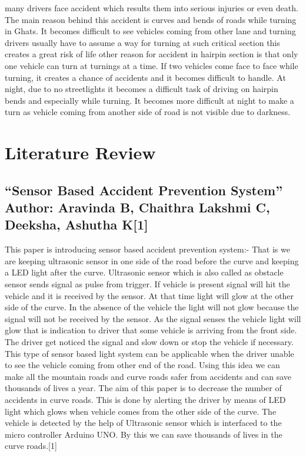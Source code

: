 \documentclass[conference]{IEEEtran}
\begin{document}
    many drivers face accident which results them into serious injuries or even death. The main reason behind
    this accident is curves and bends of roads while turning in Ghats. It becomes difficult to see vehicles coming
    from other lane and turning drivers usually have to assume a way for turning at such critical section this
    creates a great risk of life other reason for accident in hairpin section is that only one vehicle can turn at
    turnings at a time. If two vehicles come face to face while turning, it creates a chance of accidents and it
    becomes difficult to handle. At night, due to no streetlights it becomes a difficult task of driving on hairpin
    bends and especially while turning. It becomes more difficult at night to make a turn as vehicle coming from
    another side of road is not visible due to darkness.
    \section{Literature Review}

    \subsection{“Sensor Based Accident Prevention System” Author: Aravinda B, Chaithra Lakshmi C, Deeksha, Ashutha K[1]}

    This paper is introducing sensor based accident prevention system:- That is we are keeping ultrasonic sensor in one side of the road
    before the curve and keeping a LED light after the curve. Ultrasonic sensor which is also called as obstacle sensor sends signal as
    pulse from trigger. If vehicle is present signal will hit the vehicle and it is received by the sensor. At that time light will glow at the
    other side of the curve. In the absence of the vehicle the light will not glow because the signal will not be received by the sensor. As
    the signal senses the vehicle light will glow that is indication to driver that some vehicle is arriving from the front side. The driver
    get noticed the signal and slow down or stop the vehicle if necessary. This type of sensor based light system can be applicable when
    the driver unable to see the vehicle coming from other end of the road. Using this idea we can make all the mountain roads and
    curve roads safer from accidents and can save thousands of lives a year. The aim of this paper is to decrease the number of accidents
    in curve roads. This is done by alerting the driver by means of LED light which glows when vehicle comes from the other side of
    the curve. The vehicle is detected by the help of Ultrasonic sensor which is interfaced to the micro controller Arduino UNO. By this
    we can save thousands of lives in the curve roads.[1]
    
\end{document}

